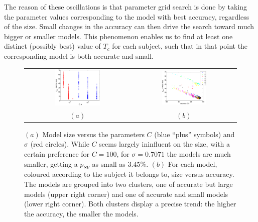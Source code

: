 \documentclass[a4paper,10pt,conference]{ieeeconf}
\begin{document}
The reason of these oscillations is that parameter grid search is done
by taking the parameter values corresponding to the model with best
accuracy, regardless of the size. Small changes in the accuracy can
then drive the search toward much bigger or smaller models. This
phenomenon enables us to find at least one distinct (possibly best)
value of $T_c$ for each subject, such that in that point the
corresponding model is both accurate and small.

\begin{figure}[!t]
  \begin{center}
    \begin{tabular}{cc}
      \includegraphics[width=0.45\textwidth]{svs_params.eps} &
      \includegraphics[width=0.45\textwidth]{acc_svs.eps} \\
      $(a)$ & $(b)$
    \end{tabular}
    \caption{$(a)$ Model size versus the parameters $C$ (blue ``plus''
    symbols) and $\sigma$ (red circles). While $C$ seems largely
    ininfluent on the size, with a certain preference for $C=100$, for
    $\sigma=0.7071$ the models are much smaller, getting a $p_{SV}$ as
    small as $3.45\%$. $(b)$ For each model, coloured according to the
    subject it belongs to, size versus accuracy. The models are
    grouped into two clusters, one of accurate but large models (upper
    right corner) and one of accurate and small models (lower right
    corner). Both clusters display a precise trend: the higher the
    accuracy, the smaller the models.}
    \label{fig:svs_params}
  \end{center}
\end{figure}
\end{document}
